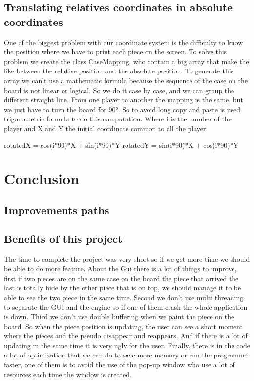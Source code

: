 \documentclass[english, 11pt, titlepage]{article}
\begin{document}
    \subsection{Translating relatives coordinates in absolute coordinates}

    One of the biggest problem with our coordinate system is the difficulty to know the position where we have to print each piece on the screen. To solve this problem we create the class CaseMapping, who contain a big array that make the like between the relative position and the absolute position. To generate this array we can’t use a mathematic formula because the sequence of the case on the board is not linear or logical. So we do it case by case, and we can group the different straight line.  From one player to another the mapping is the same, but we just have to turn the board for 90°. So to avoid long copy and paste is used trigonometric formula to do this computation. Where i is the number of the player and X and Y the initial coordinate common to all the player.

    rotatedX = cos(i*90)*X + sin(i*90)*Y
    rotatedY = sin(i*90)*X + cos(i*90)*Y


    \section{Conclusion}
    \subsection{Improvements paths}
    \subsection{Benefits of this project}

    The time to complete the project was very short so if we get more time we should be able to do more feature. About the Gui there is a lot of things to improve, first if two pieces are on the same case on the board the piece that arrived the last is totally hide by the other piece that is on top, we should manage it to be able to see the two piece in the same time. Second we don’t use multi threading to separate the GUI and the engine so if  one of them crash the whole application is down. Third we don’t use double buffering when we paint the piece on the board. So when the piece position is updating, the user can see a short moment where the pieces and the pseudo disappear and reappears. And if there is a lot of updating in the same time it is very ugly for the user. Finally, there is in the code a lot of optimization that we can do to save more memory or run the programme faster, one of them is to avoid the use of the pop-up window who use a lot of resources each time the window is created.
\end{document}
